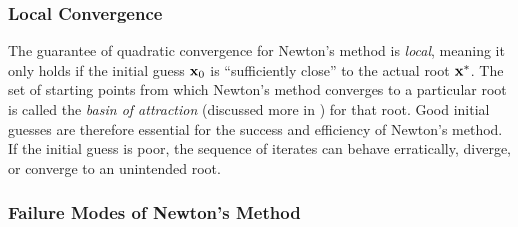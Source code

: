 \subsubsection{Local Convergence}
The guarantee of quadratic convergence for Newton's method is \textit{local}, meaning it only holds if the initial guess $\mathbf{x}_0$ is ``sufficiently close'' to the actual root $\mathbf{x}^*$. The set of starting points from which Newton's method converges to a particular root is called the \textit{basin of attraction} (discussed more in ) for that root. Good initial guesses are therefore essential for the success and efficiency of Newton's method. If the initial guess is poor, the sequence of iterates can behave erratically, diverge, or converge to an unintended root.


\subsubsection{Failure Modes of Newton's Method}
\label{sec:failure_modes_newton}

